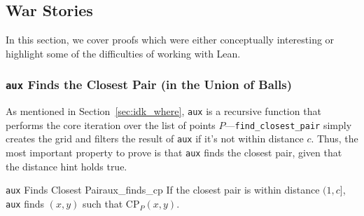\documentclass{article}
\begin{document}
\subsection{War Stories}\label{sec:war_stories}
In this section, we cover proofs which were either conceptually interesting or highlight some of the difficulties of working with Lean.

\subsubsection{{\large\texttt{aux}} Finds the Closest Pair (in the Union of Balls)}\label{sec:change_ih}

As mentioned in Section~\ref{sec:idk_where}, \texttt{aux} is a recursive function that performs the core iteration over the list of points $P$---\texttt{find\_closest\_pair} simply creates the grid and filters the result of \texttt{aux} if it's not within distance $c$.
Thus, the most important property to prove is that \texttt{aux} finds the closest pair, given that the distance hint holds true.

\begin{tcblemma}{{\large\texttt{aux}} Finds Closest Pair}{aux_finds_cp}
If the closest pair is within distance $(1, c]$, \texttt{aux} finds $(x, y)$ such that $\text{CP}_P(x, y)$.
\end{tcblemma}
\end{document}
